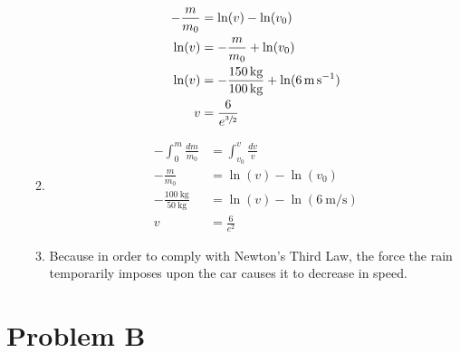\documentclass{article}
\begin{document}
\begin{enumerate}[label = \textbf{(\alph*)}]
\begin{enumerate}[label = \textbf{(\arabic*)}]
\begin{align*}
					-\frac{m}{m_0} & = \ln(v) - \ln(v_0) \\
					\ln(v) & = -\frac{m}{m_0} + \ln(v_0) \\
					\ln(v) & = -\frac{\SI{150}{\kilogram}}{\SI{100}{\kilogram}} + \ln(\SI{6}{\meter \per \second}) \\
					v & = \frac{6}{e^{\sfrac{3}{2}}}
				\end{align*}
			\item
				\begin{align*}
					-\int_0^m \frac{dm}{m_0} & = \int_{v_0}^v \frac{dv}{v} \\
					-\frac{m}{m_0} & = \ln(v) - \ln(v_0) \\
					-\frac{\SI{100}{\kilogram}}{\SI{50}{\kilogram}} & = \ln(v) - \ln(\SI{6}{\meter \per \second}) \\
					v & = \frac{6}{e^2}
				\end{align*}
			\item Because in order to comply with Newton's Third Law, the force the rain temporarily imposes upon the car causes it to decrease in speed.
		\end{enumerate}
\end{enumerate}

\section{Problem B}
\end{document}
